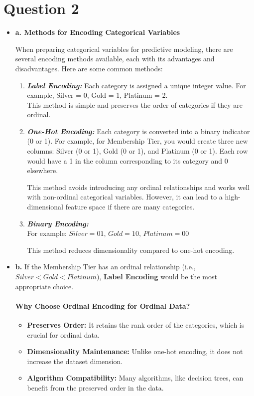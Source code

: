 \documentclass[12pt]{article}
\begin{document}
	\section{Question 2}
		\begin{itemize}
			\item \textbf{a. Methods for Encoding Categorical Variables}						
			
			
			When preparing categorical variables for predictive modeling, there are several encoding methods available, each with its advantages and disadvantages. Here are some common methods:
			\begin{enumerate}
				\item \emph{\textbf{Label Encoding:}} Each category is assigned a unique integer value. For example, Silver = 0, Gold = 1, Platinum = 2. \\
				This method is simple and preserves the order of categories if they are ordinal.
			
				\item \emph{\textbf{One-Hot Encoding:}} Each category is converted into a binary indicator (0 or 1). For example, for Membership Tier, you would create three new columns: Silver (0 or 1), Gold (0 or 1), and Platinum (0 or 1). Each row would have a 1 in the column corresponding to its category and 0 elsewhere.
			
				This method avoids introducing any ordinal relationships and works well with non-ordinal categorical variables. However, it can lead to a high-dimensional feature space if there are many categories.
			
				\item \emph{\textbf{Binary Encoding:}} \\
				For example:
				$Silver = 01$, $Gold = 10$, $Platinum = 00$ 
			
				This method reduces dimensionality compared to one-hot encoding.
			
			\end{enumerate}
			\item \textbf{b.} 
			If the Membership Tier has an ordinal relationship (i.e., $Silver < Gold < Platinum$), \textbf{Label Encoding} would be the most appropriate choice.
			
			\paragraph{Why Choose Ordinal Encoding for Ordinal Data?} 			
				\begin{itemize}
					\item \textbf{Preserves Order:} It retains the rank order of the categories, which is crucial for ordinal data.
					
					\item \textbf{Dimensionality Maintenance:} Unlike one-hot encoding, it does not increase the dataset dimension.
					
					\item \textbf{Algorithm Compatibility:} Many algorithms, like decision trees, can benefit from the preserved order in the data.
				\end{itemize}
		\end{itemize}
		
\end{document}
